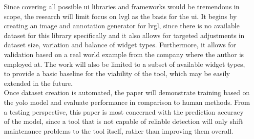 \documentclass[Bachelor, BIC, english, fhCitStyle, IEEE]{BASE/twbook} %
\begin{document}
Since covering all possible \ac{ui} libraries and frameworks would be tremendous in scope, the research will limit focus on \ac{lvgl} as the basis for the \ac{ui}. It begins by creating an image and annotation generator for \ac{lvgl}, since there is no available dataset for this library specifically and it also allows for targeted adjustments in dataset size, variation and balance of widget types. Furthermore, it allows for validation based on a real world example from the company where the author is employed at. The work will also be limited to a subset of available widget types, to provide a basic baseline for the viability of the tool, which may be easily extended in the future.\\
Once dataset creation is automated, the paper will demonstrate training based on the \ac{yolo} model and evaluate performance in comparison to human methods. From a testing perspective, this paper is most concerned with the prediction accuracy of the model, since a tool that is not capable of reliable detection will only shift maintenance problems to the tool itself, rather than improving them overall.
\clearpage
\end{document}
